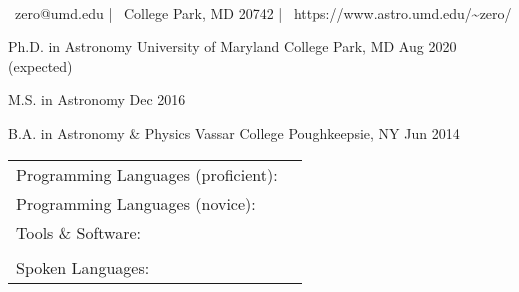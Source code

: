 \documentclass[]{awesome-cv}
\begin{document}
    
\begin{center}
	  \\
	\vspace{2mm}
	{\faEnvelope\ zero@umd.edu} | {\faMapMarker\ College Park, MD 20742} | {\faLink\ https://www.astro.umd.edu/\textasciitilde{}zero/}
\end{center}
\begin{cventries}
	\cventry
	{Ph.D. in Astronomy}
	{University of Maryland}
	{College Park, MD}
	{Aug 2020 (expected)}
	{}
	
	\vspace{-7mm}
	\cventry
	{M.S. in Astronomy}
	{}
	{}
	{Dec 2016}
	{}
	
	\vspace{-6mm}
	\cventry
	{B.A. in Astronomy \& Physics}
	{Vassar College}
	{Poughkeepsie, NY}
	{Jun 2014}
	{}
\end{cventries}

\vspace{-5mm}

\begin{cventries}
	\vspace{-3mm}
	\cventry
	{}
	{\def\arraystretch{1.15}{\begin{tabular}{ l l }
		Programming Languages (proficient):  & {\skill{ Python, C, \LaTeX, Mathematica, shell scripting}} \\
		Programming Languages (novice):  & {\skill{ HTML/CSS}} \\
		Tools \& Software:  & {\skill{ Numpy, Matplotlib, Pandas, Scikit-learn, SciPy, Seaborn}} \\
		& {\skill{ Git, Jupyter Notebook, Microsoft Office, Slurm, Unix/Linux}} \\
		Spoken Languages:  & {\skill{ English (native), Hebrew (advanced)}}
		\end{tabular}}}
	{}
	{}
	{}
\end{cventries}

\vspace{-9mm}
\end{document}
